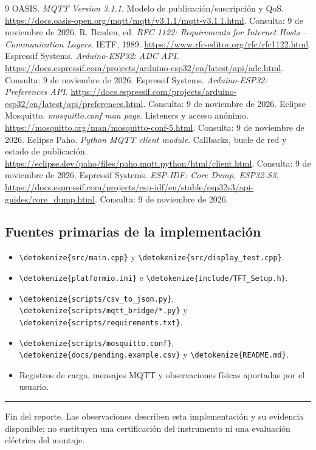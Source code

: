 \documentclass[11pt,a4paper]{article}
\newcommand{\code}[1]{\expandafter\nolinkurl\expandafter{\detokenize{#1}}}
\begin{document}
\clearpage
\begin{thebibliography}{9}
\small
{} OASIS. \emph{MQTT Version 3.1.1}. Modelo de publicación/suscripción y QoS. \url{https://docs.oasis-open.org/mqtt/mqtt/v3.1.1/mqtt-v3.1.1.html}. Consulta: 9 de noviembre de 2026.
 R. Braden, ed. \emph{RFC 1122: Requirements for Internet Hosts -- Communication Layers}. IETF, 1989. \url{https://www.rfc-editor.org/rfc/rfc1122.html}.
 Espressif Systems. \emph{Arduino-ESP32: ADC API}. \url{https://docs.espressif.com/projects/arduino-esp32/en/latest/api/adc.html}. Consulta: 9 de noviembre de 2026.
 Espressif Systems. \emph{Arduino-ESP32: Preferences API}. \url{https://docs.espressif.com/projects/arduino-esp32/en/latest/api/preferences.html}. Consulta: 9 de noviembre de 2026.
 Eclipse Mosquitto. \emph{mosquitto.conf man page}. Listeners y acceso anónimo. \url{https://mosquitto.org/man/mosquitto-conf-5.html}. Consulta: 9 de noviembre de 2026.
 Eclipse Paho. \emph{Python MQTT client module}. Callbacks, bucle de red y estado de publicación. \url{https://eclipse.dev/paho/files/paho.mqtt.python/html/client.html}. Consulta: 9 de noviembre de 2026.
 Espressif Systems. \emph{ESP-IDF: Core Dump, ESP32-S3}. \url{https://docs.espressif.com/projects/esp-idf/en/stable/esp32s3/api-guides/core_dump.html}. Consulta: 9 de noviembre de 2026.
\end{thebibliography}

\subsection*{Fuentes primarias de la implementación}
\begin{itemize}
\item \code{src/main.cpp} y \code{src/display_test.cpp}.
\item \code{platformio.ini} e \code{include/TFT_Setup.h}.
\item \code{scripts/csv_to_json.py}, \code{scripts/mqtt_bridge/*.py} y \code{scripts/requirements.txt}.
\item \code{scripts/mosquitto.conf}, \code{docs/pending.example.csv} y \code{README.md}.
\item Registros de carga, mensajes MQTT y observaciones físicas aportadas por el usuario.
\end{itemize}
\vfill
\noindent\rule{\linewidth}{0.4pt}\par
{\small\color{muted}Fin del reporte. Las observaciones describen esta implementación y su evidencia disponible; no sustituyen una certificación del instrumento ni una evaluación eléctrica del montaje.}
\end{document}
